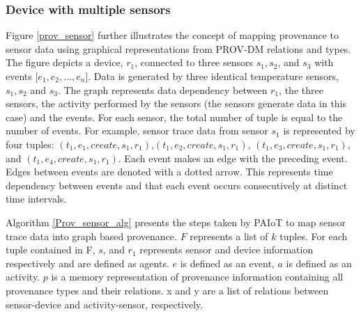 \subsubsection{Device with multiple sensors} 
Figure \ref{prov_sensor} further illustrates the concept of mapping provenance to sensor data using graphical representations from PROV-DM relations and types. The figure depicts a device, $r_1$, connected to three sensors $s_1, s_2$, and $s_3$ with events  [$e_1, e_2,...,e_n$]. Data is generated by three identical temperature sensors, $s_1, s_2$ and $s_3$. The graph represents data dependency between $r_1$, the three sensors, the activity performed by the sensors (the sensors generate data in this case) and the events. For each sensor, the total number of tuple is equal to the number of events. For example, sensor trace data from sensor $s_1$ is represented by four tuples:  $(t_1, e_1, create,  s_1, r_1)$,$(t_1, e_2, create,  s_1, r_1)$,
$(t_1, e_3, create,  s_1, r_1)$, and $(t_1, e_4, create,  s_1, r_1) $. Each event makes an edge with the preceding event. Edges between events are denoted with a dotted arrow. This represents time dependency between events and that each event occurs consecutively at distinct time intervals. 










Algorithm \ref{Prov_sensor_alg} presents the steps taken by PAIoT to map sensor trace data into graph based provenance. $F$  represents a  list of $k$ tuples. For each tuple contained in F, $s$, and $r_1$ represents sensor and device information respectively and are defined as agents. $e$ is defined as an event, $a$ is defined as an activity. $p$ is a memory representation of provenance information containing all  provenance types and their relations. x and y are a list of relations between sensor-device and activity-sensor, respectively.

